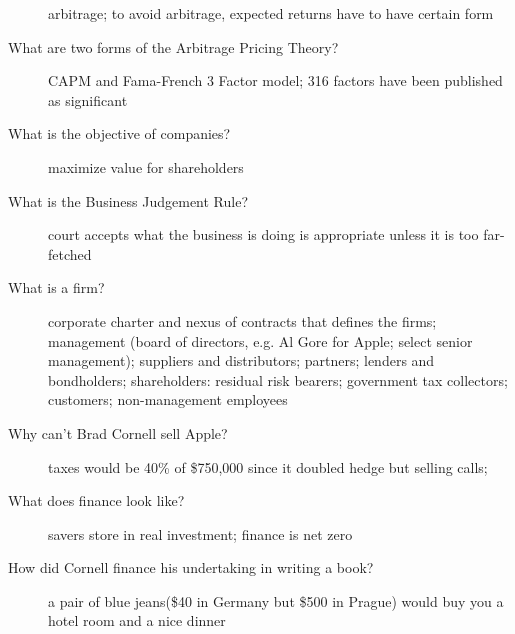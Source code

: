 \documentclass[11pt]{article}
\begin{document}
\begin{description}
  arbitrage;
  to avoid arbitrage, expected returns have to have certain form
\item[What are two forms of the Arbitrage Pricing Theory?]
  CAPM and Fama-French 3 Factor model;
  316 factors have been published as significant
\item[What is the objective of companies?]
  maximize value for shareholders
\item[What is the Business Judgement Rule?]
  court accepts what the business is doing is appropriate unless it is too far-fetched
\item[What is a firm?]
  corporate charter and nexus of contracts that defines the firms;
  management (board of directors, e.g. Al Gore for Apple; select senior management);
  suppliers and distributors;
  partners;
  lenders and bondholders;
  shareholders: residual risk bearers;
  government tax collectors;
  customers;
  non-management employees
\item[Why can't Brad Cornell sell Apple?]
  taxes would be 40\% of \$750,000 since it doubled
  hedge but selling calls;
\item[What does finance look like?]
  savers store in real investment;
  finance is net zero
\item[How did Cornell finance his undertaking in writing a book?]
  a pair of blue jeans(\$40 in Germany but \$500 in Prague) would buy you a hotel room and a nice dinner
\end{description}
\end{document}

